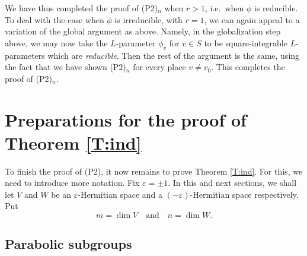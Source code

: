 \documentclass[11pt]{amsart}
\numberwithin{equation}{section}
\theoremstyle{plain}
\theoremstyle{definition}
\theoremstyle{remark}
\begin{document}
We have thus completed the proof of (P2)$_n$ when $r >1$, i.e.~when $\phi$ is reducible. To deal with the case when $\phi$ is irreducible, with $r = 1$, we can again appeal to a variation of the global argument as above.
Namely, in the globalization step above, we may now take the $L$-parameter $\phi_v$ for $v \in S$ to be square-integrable $L$-parameters which are \emph{reducible}. Then the rest of the argument is the same, using the fact that we have shown (P2)$_n$ for every place $v \ne v_0$. This completes the proof of (P2)$_n$.

\section{\textbf{Preparations for the proof of Theorem \ref{T:ind}}}

To finish the proof of (P2), it now remains to prove Theorem \ref{T:ind}.
For this, we need to introduce more notation.
Fix $\varepsilon = \pm 1$. 
In this and next sections, we shall let $V$ and $W$ be an $\varepsilon$-Hermitian space and a $(-\varepsilon)$-Hermitian space respectively.
Put
\[
 m = \dim V \quad \text{and} \quad n = \dim W. 
\]

\subsection{Parabolic subgroups}
\end{document}
